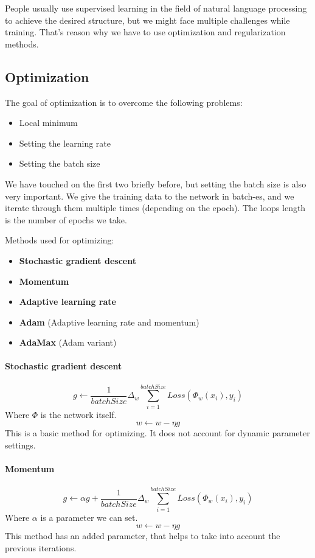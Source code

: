 People usually use supervised learning in the field of natural language processing to achieve the desired structure, but we might face multiple challenges while training. That's reason why we have to use optimization and regularization methods.

\subsection{Optimization}
The goal of optimization is to overcome the following problems:
\begin{itemize}
	\item Local minimum
	\item Setting the learning rate
	\item Setting the batch size
\end{itemize}

We have touched on the first two briefly before, but setting the batch size is also very important. We give the training data to the network in batch-es, and we iterate through them multiple times (depending on the epoch). The loops length is the number of epochs we take.

Methods used for optimizing:
\begin{itemize}
	\item \textbf{Stochastic gradient descent}
	\item \textbf{Momentum}
	\item \textbf{Adaptive learning rate}
	\item \textbf{Adam} (Adaptive learning rate and momentum)
	\item \textbf{AdaMax} (Adam variant)
\end{itemize}

\paragraph*{Stochastic gradient descent}
\[g \leftarrow \frac{1}{batchSize}\Delta_w \sum_{i=1}^{batchSize}Loss(\Phi_w(x_i), y_i)\]
Where \(\Phi\) is the network itself.
\[w \leftarrow w - \eta g\]
This is a basic method for optimizing. It does not account for dynamic parameter settings.

\paragraph*{Momentum}
\[g \leftarrow \alpha g + \frac{1}{batchSize}\Delta_w \sum_{i=1}^{batchSize}Loss(\Phi_w(x_i), y_i)\]
Where \(\alpha\) is a parameter we can set.
\[w \leftarrow w - \eta g\]
This method has an added parameter, that helps to take into account the previous iterations.


